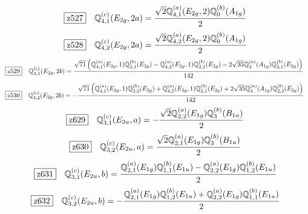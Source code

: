 \documentclass[fleqn,10pt,landscape]{jsarticle}
\begin{document}
\begin{dmath*}
\hspace*{3mm}\fbox{z527}\quad \mathbb{Q}_{4,1}^{(c)}(E_{2g},2a)=\frac{\sqrt{2} \mathbb{Q}_{4,1}^{(a)}(E_{2g},2) \mathbb{Q}_{0}^{(b)}(A_{1g})}{2}
\end{dmath*}
\begin{dmath*}
\hspace*{3mm}\fbox{z528}\quad \mathbb{Q}_{4,2}^{(c)}(E_{2g},2a)=\frac{\sqrt{2} \mathbb{Q}_{4,2}^{(a)}(E_{2g},2) \mathbb{Q}_{0}^{(b)}(A_{1g})}{2}
\end{dmath*}
\begin{dmath*}
\hspace*{3mm}\fbox{z529}\quad \mathbb{Q}_{4,1}^{(c)}(E_{2g},2b)=\frac{\sqrt{71} \left(\mathbb{Q}_{4,1}^{(a)}(E_{2g},1) \mathbb{Q}_{2,1}^{(b)}(E_{2g}) - \mathbb{Q}_{4,2}^{(a)}(E_{2g},1) \mathbb{Q}_{2,2}^{(b)}(E_{2g}) - 2 \sqrt{35} \mathbb{Q}_{4}^{(a)}(A_{1g}) \mathbb{Q}_{2,1}^{(b)}(E_{2g})\right)}{142}
\end{dmath*}
\begin{dmath*}
\hspace*{3mm}\fbox{z530}\quad \mathbb{Q}_{4,2}^{(c)}(E_{2g},2b)=- \frac{\sqrt{71} \left(\mathbb{Q}_{4,1}^{(a)}(E_{2g},1) \mathbb{Q}_{2,2}^{(b)}(E_{2g}) + \mathbb{Q}_{4,2}^{(a)}(E_{2g},1) \mathbb{Q}_{2,1}^{(b)}(E_{2g}) + 2 \sqrt{35} \mathbb{Q}_{4}^{(a)}(A_{1g}) \mathbb{Q}_{2,2}^{(b)}(E_{2g})\right)}{142}
\end{dmath*}
\begin{dmath*}
\hspace*{3mm}\fbox{z629}\quad \mathbb{Q}_{3,1}^{(c)}(E_{2u},a)=- \frac{\sqrt{2} \mathbb{Q}_{2,2}^{(a)}(E_{1g}) \mathbb{Q}_{3}^{(b)}(B_{1u})}{2}
\end{dmath*}
\begin{dmath*}
\hspace*{3mm}\fbox{z630}\quad \mathbb{Q}_{3,2}^{(c)}(E_{2u},a)=\frac{\sqrt{2} \mathbb{Q}_{2,1}^{(a)}(E_{1g}) \mathbb{Q}_{3}^{(b)}(B_{1u})}{2}
\end{dmath*}
\begin{dmath*}
\hspace*{3mm}\fbox{z631}\quad \mathbb{Q}_{3,1}^{(c)}(E_{2u},b)=\frac{\mathbb{Q}_{2,1}^{(a)}(E_{1g}) \mathbb{Q}_{1,1}^{(b)}(E_{1u}) - \mathbb{Q}_{2,2}^{(a)}(E_{1g}) \mathbb{Q}_{1,2}^{(b)}(E_{1u})}{2}
\end{dmath*}
\begin{dmath*}
\hspace*{3mm}\fbox{z632}\quad \mathbb{Q}_{3,2}^{(c)}(E_{2u},b)=- \frac{\mathbb{Q}_{2,1}^{(a)}(E_{1g}) \mathbb{Q}_{1,2}^{(b)}(E_{1u}) + \mathbb{Q}_{2,2}^{(a)}(E_{1g}) \mathbb{Q}_{1,1}^{(b)}(E_{1u})}{2}
\end{dmath*}
\end{document}
